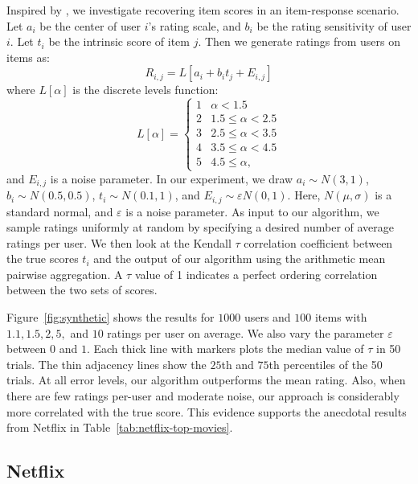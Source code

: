 \documentclass{sig-alternate}
\newcommand{\eps}{\varepsilon}
\begin{document}
Inspired by \citet{ho2008-ratings}, we investigate
recovering item scores in an item-response scenario.
Let $a_i$ be the center of user $i$'s rating scale,
and $b_i$ be the rating sensitivity of user $i$.
Let $t_i$ be the intrinsic score of item $j$.  
Then we generate ratings from users on items
as: 
\[ R_{i,j} = L[ a_i + b_i t_j + E_{i,j} ] \]
where $L[\alpha]$ is the discrete levels function: 
\[ L[\alpha] = 
\begin{cases} 
  1 & \alpha < 1.5 \\
	2 & 1.5 \le \alpha < 2.5 \\
	3 & 2.5 \le \alpha < 3.5 \\
	4 & 3.5 \le \alpha < 4.5 \\
	5 & 4.5 \le \alpha, \end{cases} \]
and $E_{i,j}$ is a noise parameter.	
In our experiment, we draw $a_i \sim N(3,1)$, 
$b_i \sim N(0.5, 0.5)$, $t_i \sim N(0.1, 1)$,
and $E_{i,j} \sim \eps N(0,1)$.  Here,
$N(\mu,\sigma)$ is a standard normal, and
$\eps$ is a noise
parameter.  As input to our algorithm, 
we sample ratings uniformly at random by
specifying a desired number of average ratings
per user.  We then look at
the Kendall $\tau$ correlation coefficient
between the true scores $t_i$ and the output
of our algorithm using the arithmetic mean
pairwise aggregation.  A $\tau$ value of
1 indicates a perfect ordering correlation
between the two sets of scores.

Figure~\ref{fig:synthetic} shows the results
for $1000$ users and $100$ items with 
$1.1,1.5, 2, 5, $ and $10$ ratings 
per user on average.  We also vary the
parameter $\eps$ between $0$ and $1$.
Each thick line with markers plots the 
median value of $\tau$ in 50 trials.  The
thin adjacency lines show the $25$th and
$75$th percentiles of the 50 trials.  
At all error levels, our algorithm
outperforms the mean rating.  Also,
when there are few ratings per-user
and moderate noise, 
our approach is considerably more
correlated with the true score.  
This evidence supports the
anecdotal results from Netflix in 
Table~\ref{tab:netflix-top-movies}.

\subsection{Netflix}
\label{sec:netflix}
\end{document}
